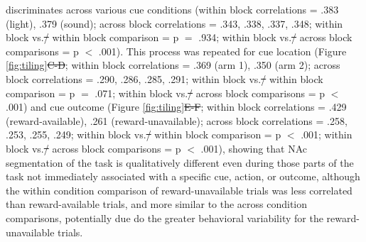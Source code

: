 \documentclass[11pt]{article}
\providecommand{\DIFadd}[1]{{\protect\color{blue}\uwave{#1}}} %
\providecommand{\DIFdel}[1]{{\protect\color{red}\sout{#1}}}                      %
\providecommand{\DIFaddbegin}{} %
\providecommand{\DIFaddend}{} %
\providecommand{\DIFdelbegin}{} %
\providecommand{\DIFdelend}{} %
\newcommand{\DIFscaledelfig}{0.5}
\newlength{\DIFdelgraphicswidth} %
\newlength{\DIFdelgraphicsheight} %
\newcommand{\DIFaddincludegraphics}[2][]{{\color{blue}\fbox{\DIFOincludegraphics[#1]{#2}}}} %
\newcommand{\DIFdelincludegraphics}[2][]{%
\sbox{\DIFdelgraphicsbox}{\DIFOincludegraphics[#1]{#2}}%
\settoboxwidth{\DIFdelgraphicswidth}{\DIFdelgraphicsbox} %
\settoboxtotalheight{\DIFdelgraphicsheight}{\DIFdelgraphicsbox} %
\scalebox{\DIFscaledelfig}{%
\parbox[b]{\DIFdelgraphicswidth}{\usebox{\DIFdelgraphicsbox}\\[-\baselineskip] \rule{\DIFdelgraphicswidth}{0em}}\llap{\resizebox{\DIFdelgraphicswidth}{\DIFdelgraphicsheight}{%
\setlength{\unitlength}{\DIFdelgraphicswidth}%
\begin{picture}(1,1)%
\thicklines\linethickness{2pt} %
{\color[rgb]{1,0,0}\put(0,0){\framebox(1,1){}}}%
{\color[rgb]{1,0,0}\put(0,0){\line( 1,1){1}}}%
{\color[rgb]{1,0,0}\put(0,1){\line(1,-1){1}}}%
\end{picture}%
}\hspace*{3pt}}} %
} %
\DeclareRobustCommand{\DIFaddbegin}{\DIFOaddbegin \let\includegraphics\DIFaddincludegraphics} %
\DeclareRobustCommand{\DIFaddend}{\DIFOaddend \let\includegraphics\DIFOincludegraphics} %
\DeclareRobustCommand{\DIFdelbegin}{\DIFOdelbegin \let\includegraphics\DIFdelincludegraphics} %
\DeclareRobustCommand{\DIFdelend}{\DIFOaddend \let\includegraphics\DIFOincludegraphics} %
\begin{document}
discriminates across various cue conditions (within block correlations = .383 (light), .379 (sound); across block correlations = .343, .338, .337, .348; within block vs.\DIFdelbegin \DIFdel{/ }\DIFdelend \DIFaddbegin \DIFadd{\ }\DIFaddend within block comparison = p $=$ .934; within block vs.\DIFdelbegin \DIFdel{/ }\DIFdelend \DIFaddbegin \DIFadd{\ }\DIFaddend across block comparisons = p $<$ .001). This process was repeated for cue location (Figure \ref{fig:tiling}\DIFdelbegin \DIFdel{C-D}\DIFdelend \DIFaddbegin \DIFadd{B,E}\DIFaddend ; within block correlations = .369 (arm 1), .350 (arm 2); across block correlations = .290, .286, .285, .291; within block vs.\DIFdelbegin \DIFdel{/ }\DIFdelend \DIFaddbegin \DIFadd{\ }\DIFaddend within block comparison = p $=$ .071; within block vs.\DIFdelbegin \DIFdel{/ }\DIFdelend \DIFaddbegin \DIFadd{\ }\DIFaddend across block comparisons = p $<$ .001) and cue outcome (Figure \ref{fig:tiling}\DIFdelbegin \DIFdel{E-F}\DIFdelend \DIFaddbegin \DIFadd{C,F}\DIFaddend ;  within block correlations = .429 (reward-available), .261 (reward-unavailable); across block correlations = .258, .253, .255, .249; within block vs.\DIFdelbegin \DIFdel{/ }\DIFdelend \DIFaddbegin \DIFadd{\ }\DIFaddend within block comparison = p $<$ .001; within block vs.\DIFdelbegin \DIFdel{/ }\DIFdelend \DIFaddbegin \DIFadd{\ }\DIFaddend across block comparisons = p $<$ .001), showing that NAc segmentation of the task is qualitatively
different even during those parts of the task not immediately associated with a
specific cue, action, or outcome, although the within condition comparison of
reward-unavailable trials was less correlated than reward-available trials, and
more similar to the across condition comparisons, potentially due do the greater behavioral variability for the reward-unavailable trials.
\end{document}
